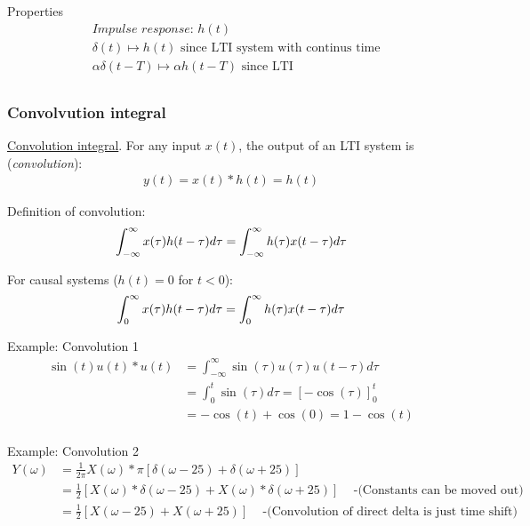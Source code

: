 \documentclass{article}
\begin{document}
Properties
\begin{align*}
    &\textit{Impulse response: } h(t) \\
    &\delta(t) \mapsto h(t) \text{ since LTI system with continus time}\\
    &\alpha\delta(t-T) \mapsto \alpha h(t-T) \text{ since LTI}\\
\end{align*}


\subsubsection{Convolvution integral}
\href{https://www.youtube.com/watch?v=35gc3GE4Ddo}{Convolution integral}.
For any input $x(t)$, the output of an LTI system is (\textit{convolution}):
\begin{align*}
    y(t) = x(t)*h(t) = h(t)
\end{align*}

\noindent Definition of convolution:
\begin{equation}
    \int_{-\infty}^{\infty}x(\tau)h(t-\tau)d\tau = \int_{-\infty}^{\infty}h(\tau)x(t-\tau)d\tau \\
\end{equation}

\noindent For causal systems ($h(t)=0$ for $t<0$):
\begin{equation}
    \int_{0}^{\infty}x(\tau)h(t-\tau)d\tau = \int_{0}^{\infty}h(\tau)x(t-\tau)d\tau \\
\end{equation}


\begin{exampleblock}{Example: Convolution 1}
\begin{align*}
    \sin(t)u(t)*u(t) &= \int_{-\infty}^{\infty} \sin(\tau)u(\tau)u(t-\tau)d\tau \\
    &= \int_{0}^{t} \sin(\tau)d\tau = [-\cos(\tau)]_0^t \\
    &= -\cos(t)+\cos(0) = 1- \cos(t) \\
\end{align*}    
\end{exampleblock}

\begin{exampleblock}{Example: Convolution 2}
\begin{align*}
    Y(\omega) &= \frac{1}{2\pi}X(\omega) * \pi [\delta(\omega-25)+\delta(\omega+25)] \\
    &= \frac{1}{2}[X(\omega)*\delta(\omega-25) + X(\omega)*\delta(\omega+25)] \;\;\; \text{ -(Constants can be moved out)} \\
    &= \frac{1}{2}[X(\omega-25) + X(\omega+25)] \;\;\; \text{ -(Convolution of direct delta is just time shift)} \\
\end{align*}    
\end{exampleblock}
\end{document}
